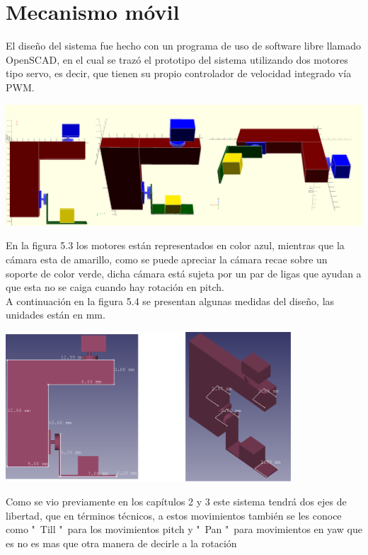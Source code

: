 \section{Mecanismo móvil}
El diseño del sistema fue hecho con un programa de uso de software libre llamado OpenSCAD, en el cual se trazó el prototipo del
sistema utilizando dos motores tipo servo, es decir, que tienen su propio controlador de velocidad integrado vía PWM.
\begin{center}
	\includegraphics[width=1.0\textwidth]{Contenido/Cuerpo/Capitulo5/Fig14.eps}
	\label{Fig1}
\end{center}
En la figura 5.3 los motores están representados en color azul, mientras que la cámara esta de amarillo, como se puede apreciar
la cámara recae sobre un soporte de color verde, dicha cámara está sujeta por un par de ligas que ayudan a que esta no se
caiga cuando hay rotación en pitch.\\
A continuación en la figura 5.4 se presentan algunas medidas del diseño, las unidades están en mm.
\begin{center}
	\includegraphics[width=0.8\textwidth]{Contenido/Cuerpo/Capitulo5/Fig16.eps}
	\label{Fig1}
\end{center}
Como se vio previamente en los capítulos 2 y 3 este sistema tendrá dos ejes de libertad, que en términos técnicos, a estos
movimientos también se les conoce como "\ Till "\ para los movimientos pitch y "\ Pan "\ para movimientos en yaw que es no es mas que otra manera de decirle a la rotación
